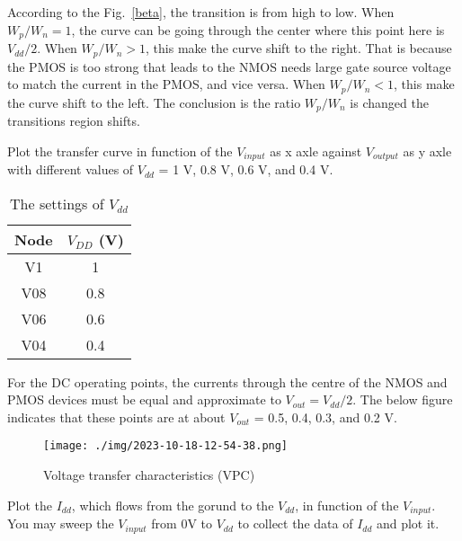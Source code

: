 \documentclass{article}
\begin{document}
\vspace*{-2em}

\par According to the Fig.~\ref{beta},  the transition is from high to low. When $W_p/W_n = 1$, the curve can be going through the center where this point here is $V_{dd}/2$. When $W_p/W_n > 1$, this make the curve shift to the right. That is because the PMOS is too strong that leads to the NMOS needs large gate source voltage to match the current in the PMOS, and vice versa. When $W_p/W_n < 1$, this make the curve shift to the left. The conclusion is the ratio $W_p/W_n$ is changed the transitions region shifts.

\clearpage

 Plot the transfer curve in function of the $V_{input}$ as x axle against $V_{output}$ as y axle with different values of $V_{dd}$ = 1 V, 0.8 V, 0.6 V, and 0.4 V.

        \begin{table}[H]
            \centering\large
            \caption{The settings of $V_{dd}$}
            \begin{tabular}{|c|c|}
                \hline
                \textbf{Node} & \textbf{$V_{DD}$ (V)}  \\
                \hline
               V1 & 1\\
                \hline
                V08 & 0.8\\
                \hline
                V06 & 0.6\\
                \hline
                V04 & 0.4 \\ \hline
            \end{tabular}
        \end{table}

    For the DC operating points, the currents through the centre of the NMOS and PMOS devices must be equal and approximate to $V_{out}=V_{dd}/2$. The below figure indicates that these points are at about $V_{out}$ = 0.5, 0.4, 0.3, and 0.2 V.

    \begin{figure}[H]
        
        \centering
        \texttt{[image: ./img/2023-10-18-12-54-38.png]}
        \caption{Voltage transfer characteristics (VPC)}
    \end{figure}


     Plot the $I_{dd}$, which flows from the gorund to the $V_{dd}$, in function of the $V_{input}$. You may sweep the $V_{input}$ from 0V to $V_{dd}$ to collect the data of $I_{dd}$ and plot it.
\end{document}
